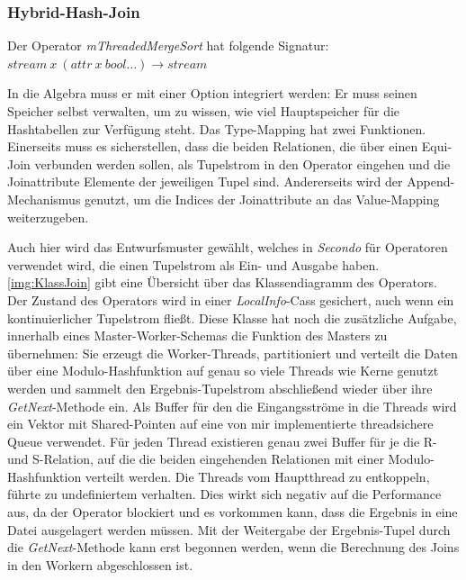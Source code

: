 \documentclass[a4paper,12pt,twoside]{article}
\newcommand{\Fb}[1]{\textit{#1}} %
\begin{document}
\subsubsection{Hybrid-Hash-Join}
\label{impl:hybrid}

Der Operator \Fb{mThreadedMergeSort} hat folgende Signatur: \newline
$stream~x~(attr~x~bool \ldots) \longrightarrow stream$

In die Algebra muss er mit einer Option integriert werden: Er muss seinen Speicher selbst verwalten, um zu wissen, wie viel Hauptspeicher für die Hashtabellen zur Verfügung steht. Das Type-Mapping hat zwei Funktionen. Einerseits muss es sicherstellen, dass die beiden Relationen, die über einen Equi-Join verbunden werden sollen, als Tupelstrom in den Operator eingehen und die Joinattribute Elemente der jeweiligen Tupel sind. Andererseits wird der Append-Mechanismus genutzt, um die Indices der Joinattribute an das Value-Mapping weiterzugeben.

Auch hier wird das Entwurfsmuster gewählt, welches in \Fb{Secondo} für Operatoren verwendet wird, die einen Tupelstrom als Ein- und Ausgabe haben. \autoref{img:KlassJoin} gibt eine Übersicht über das Klassendiagramm des Operators. Der Zustand des Operators wird in einer \Fb{LocalInfo}-Cass gesichert, auch wenn ein kontinuierlicher Tupelstrom fließt. Diese Klasse hat noch die zusätzliche Aufgabe, innerhalb eines Master-Worker-Schemas die Funktion des Masters zu übernehmen: Sie erzeugt die Worker-Threads, partitioniert und verteilt die Daten über eine Modulo-Hashfunktion auf genau so viele Threads wie Kerne genutzt werden und sammelt den Ergebnis-Tupelstrom abschließend wieder über ihre \Fb{GetNext}-Methode ein. Als Buffer für den die Eingangsströme in die Threads wird ein Vektor mit Shared-Pointen auf eine von mir implementierte threadsichere Queue verwendet. Für jeden Thread existieren genau zwei Buffer für je die R- und S-Relation, auf die die beiden eingehenden Relationen mit einer Modulo-Hashfunktion verteilt werden. Die Threads vom Hauptthread zu entkoppeln, führte zu undefiniertem verhalten. Dies wirkt sich negativ auf die Performance aus, da der Operator blockiert und es vorkommen kann, dass die Ergebnis in eine Datei ausgelagert werden müssen. Mit der Weitergabe der Ergebnis-Tupel durch die \Fb{GetNext}-Methode kann erst begonnen werden, wenn die Berechnung des Joins in den Workern abgeschlossen ist. 
\end{document}
